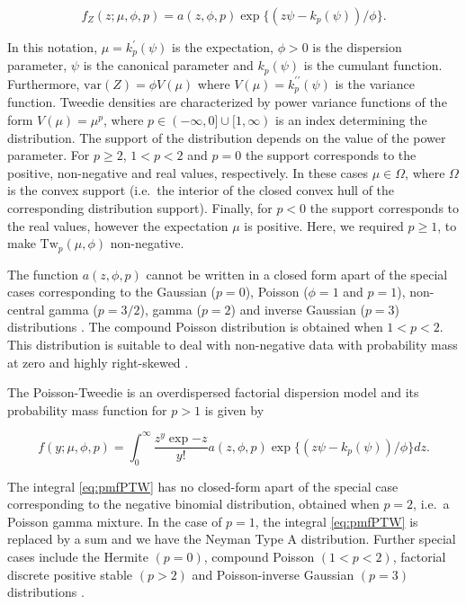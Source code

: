 \documentclass[9pt,a5paper,]{book}
\theoremstyle{definition}
\theoremstyle{definition}
\theoremstyle{remark}
\begin{document}
\begin{equation}
f_{Z}(z; \mu, \phi, p) = a(z,\phi,p) \exp\{(z\psi - k_p(\psi))/\phi\}.
\label{eq:tweedie}
\end{equation}

In this notation, \(\mu = k^{\prime}_p(\psi)\) is the expectation,
\(\phi > 0\) is the dispersion parameter, \(\psi\) is the canonical
parameter and \(k_p(\psi)\) is the cumulant function. Furthermore,
\(\mathrm{var}(Z) = \phi V(\mu)\) where
\(V(\mu) = k^{\prime \prime}_p(\psi)\) is the variance function. Tweedie
densities are characterized by power variance functions of the form
\(V(\mu) = \mu^p\), where \(p \in (-\infty ,0] \cup [1,\infty)\) is an
index determining the distribution. The support of the distribution
depends on the value of the power parameter. For \(p \geq 2\),
\(1 < p < 2\) and \(p = 0\) the support corresponds to the positive,
non-negative and real values, respectively. In these cases
\(\mu \in \Omega\), where \(\Omega\) is the convex support (i.e.~the
interior of the closed convex hull of the corresponding distribution
support). Finally, for \(p < 0\) the support corresponds to the real
values, however the expectation \(\mu\) is positive. Here, we required
\(p \geq 1\), to make \(\mathrm{Tw}_p(\mu, \phi)\) non-negative.

The function \(a(z,\phi, p)\) cannot be written in a closed form apart
of the special cases corresponding to the Gaussian (\(p = 0\)), Poisson
(\(\phi = 1\) and \(p = 1\)), non-central gamma (\(p = 3/2\)), gamma
(\(p = 2\)) and inverse Gaussian (\(p = 3\)) distributions
\citep{Jorgensen1997}. The compound Poisson distribution is obtained
when \(1 < p < 2\). This distribution is suitable to deal with
non-negative data with probability mass at zero and highly right-skewed
\citep{Andersen2016}.

The Poisson-Tweedie is an overdispersed factorial dispersion model
\citep{Jorgensen2014} and its probability mass function for \(p > 1\) is
given by

\begin{equation}
f(y;\mu,\phi,p) = \int_0^\infty \frac{z^y \exp{-z}}{y!} a(z,\phi,p) \exp\{(z\psi - k_p(\psi))/\phi\} dz.
\label{eq:pmfPTW}
\end{equation}

The integral \eqref{eq:pmfPTW} has no closed-form apart of the special
case corresponding to the negative binomial distribution, obtained when
\(p = 2\), i.e.~a Poisson gamma mixture. In the case of \(p=1\), the
integral \eqref{eq:pmfPTW} is replaced by a sum and we have the Neyman
Type A distribution. Further special cases include the Hermite
\((p = 0)\), compound Poisson \((1 < p < 2)\), factorial discrete
positive stable \((p > 2)\) and Poisson-inverse Gaussian \((p = 3)\)
distributions \citetext{\citealp[
]{Jorgensen2014}; \citealp{Kokonendji2004}}.
\end{document}
